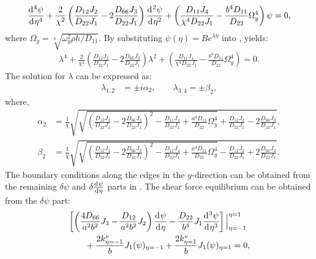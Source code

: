 \documentclass[preprint,12pt]{elsarticle}
\newcommand{\id}{\mathrm{d}\mkern1mu}
\begin{document}
%
\begin{equation}\label{eq:ODEy}
		\frac{\id^4 \psi}{\id \eta^4} + \frac{2}{\chi^2}\left(\frac{D_{12}J_2}{D_{22}J_1} - 2\frac{D_{66}J_3}{D_{22}J_1}\right)\frac{\id^2 \psi}{\id \eta^2} + \left( \frac{D_{11}J_4}{\chi^4D_{22}J_1} - \frac{b^4D_{11}}{D_{22}} \Omega_y^4 \right) \psi = 0,
\end{equation}
%
where $\Omega_y = \sqrt[4]{{\omega_y^2 \rho h}/D_{11}}$.
By substituting $\psi(\eta) = B e^{\lambda \eta}$ into , yields:
%
\begin{equation}\label{eq:ODEy2}
	\begin{split}
		\lambda^4 + \frac{2}{\chi^2} \left( \frac{D_{12}J_2}{D_{22}J_1} - 2\frac{D_{66}J_3}{D_{22}J_1} \right) \lambda^2 + \left( \frac{D_{11}J_4}{\chi^4D_{22}J_1} - \frac{b^4D_{11}}{D_{22}} \Omega_y^4 \right) = 0.
	\end{split}
\end{equation}
%
The solution for $\lambda$ can be expressed as:
%
\begin{equation}\label{eq:lambda}
	\begin{split}
		\lambda_{1,2} &= \pm \textit{i} \alpha_2, \qquad \lambda_{3,4} = \pm \beta_2,
	\end{split}
\end{equation}
%
where,
%
\begin{subequations}\label{eq:beta}
	\begin{align}
		\alpha_2 &= \frac{1}{\chi} \sqrt{ \sqrt{ \left( \frac{D_{12}J_2}{D_{22}J_1} - 2\frac{D_{66}J_3}{D_{22}J_1} \right)^2 - \frac{D_{11}J_4}{D_{22}J_1} + \frac{a^4 D_{11}}{D_{22}} \Omega_y^4 } + \frac{D_{12}J_2}{D_{22}J_1} - 2 \frac{D_{66}J_3}{D_{22}J_1}}, \\
		\beta_2 &= \frac{1}{\chi} \sqrt{ \sqrt{ \left( \frac{D_{12}J_2}{D_{22}J_1} - 2 \frac{D_{66}J_3}{D_{22}J_1} \right)^2 - \frac{D_{11}J_4}{D_{22}J_1} + \frac{a^4 D_{11}}{D_{22}} \Omega_y^4 } - \frac{D_{12}J_2}{D_{22}J_1} + 2 \frac{D_{66}J_3}{D_{22}J_1}}.
	\end{align}
\end{subequations}
%
The boundary conditions along the edges in the $y$-direction can be obtained from the remaining $\delta \psi$ and $\delta \frac{\id \psi}{\id \eta}$ parts in . 
The shear force equilibrium can be obtained from the $\delta \psi$ part:
%
\begin{equation}\label{eq:inertial_forcey}
	\begin{split}
		& \left[ \left( \frac{4D_{66}}{a^2b^2} J_3 - \frac{D_{12}}{a^2b^2} J_2 \right) \frac{\id \psi}{\id \eta} 
		- \frac{D_{22}}{b^4} J_1 \frac{\id^3 \psi}{\id \eta^3} \right] \Big|^{\eta=1}_{\eta=-1} \\
		&\qquad + \frac{2k^v_{\eta=-1}}{b} J_1 (\psi )_{\eta=-1} + \frac{2k^v_{\eta=1}}{b} J_1 (\psi )_{\eta=1} = 0,
	\end{split}
\end{equation}
\end{document}
